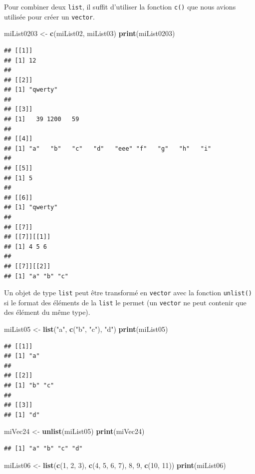 \documentclass[]{book}
\newenvironment{Shaded}{\begin{snugshade}}{\end{snugshade}}
\newcommand{\KeywordTok}[1]{\textcolor[rgb]{0.13,0.29,0.53}{\textbf{#1}}}
\newcommand{\DecValTok}[1]{\textcolor[rgb]{0.00,0.00,0.81}{#1}}
\newcommand{\StringTok}[1]{\textcolor[rgb]{0.31,0.60,0.02}{#1}}
\newcommand{\NormalTok}[1]{#1}
\begin{document}
Pour combiner deux \texttt{list}, il suffit d'utiliser la fonction
\texttt{c()} que nous avions utilisée pour créer un \texttt{vector}.

\begin{Shaded}
\begin{Highlighting}[]
\NormalTok{miList0203 <-}\StringTok{ }\KeywordTok{c}\NormalTok{(miList02, miList03)}
\KeywordTok{print}\NormalTok{(miList0203)}
\end{Highlighting}
\end{Shaded}

\begin{verbatim}
## [[1]]
## [1] 12
## 
## [[2]]
## [1] "qwerty"
## 
## [[3]]
## [1]   39 1200   59
## 
## [[4]]
## [1] "a"   "b"   "c"   "d"   "eee" "f"   "g"   "h"   "i"  
## 
## [[5]]
## [1] 5
## 
## [[6]]
## [1] "qwerty"
## 
## [[7]]
## [[7]][[1]]
## [1] 4 5 6
## 
## [[7]][[2]]
## [1] "a" "b" "c"
\end{verbatim}

Un objet de type \texttt{list} peut être transformé en \texttt{vector}
avec la fonction \texttt{unlist()} si le format des éléments de la
\texttt{list} le permet (un \texttt{vector} ne peut contenir que des
élément du même type).

\begin{Shaded}
\begin{Highlighting}[]
\NormalTok{miList05 <-}\StringTok{ }\KeywordTok{list}\NormalTok{(}\StringTok{"a"}\NormalTok{, }\KeywordTok{c}\NormalTok{(}\StringTok{"b"}\NormalTok{, }\StringTok{"c"}\NormalTok{), }\StringTok{"d"}\NormalTok{)}
\KeywordTok{print}\NormalTok{(miList05)}
\end{Highlighting}
\end{Shaded}

\begin{verbatim}
## [[1]]
## [1] "a"
## 
## [[2]]
## [1] "b" "c"
## 
## [[3]]
## [1] "d"
\end{verbatim}

\begin{Shaded}
\begin{Highlighting}[]
\NormalTok{miVec24 <-}\StringTok{ }\KeywordTok{unlist}\NormalTok{(miList05)}
\KeywordTok{print}\NormalTok{(miVec24)}
\end{Highlighting}
\end{Shaded}

\begin{verbatim}
## [1] "a" "b" "c" "d"
\end{verbatim}

\begin{Shaded}
\begin{Highlighting}[]
\NormalTok{miList06 <-}\StringTok{ }\KeywordTok{list}\NormalTok{(}\KeywordTok{c}\NormalTok{(}\DecValTok{1}\NormalTok{, }\DecValTok{2}\NormalTok{, }\DecValTok{3}\NormalTok{), }\KeywordTok{c}\NormalTok{(}\DecValTok{4}\NormalTok{, }\DecValTok{5}\NormalTok{, }\DecValTok{6}\NormalTok{, }\DecValTok{7}\NormalTok{), }\DecValTok{8}\NormalTok{, }\DecValTok{9}\NormalTok{, }\KeywordTok{c}\NormalTok{(}\DecValTok{10}\NormalTok{, }\DecValTok{11}\NormalTok{))}
\KeywordTok{print}\NormalTok{(miList06)}
\end{Highlighting}
\end{Shaded}
\end{document}

